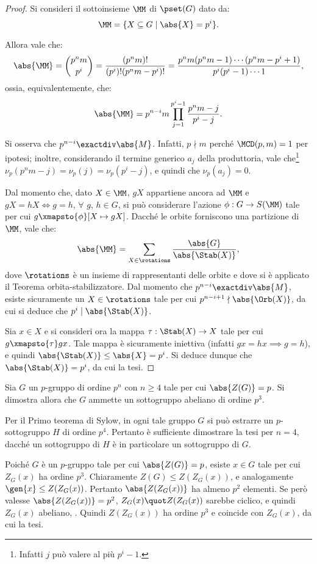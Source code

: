 \documentclass[12pt]{scrartcl}
\begin{document}
	\begin{proof}
		Si consideri il sottoinsieme $\MM$
		di $\pset(G)$ dato da:
		\[ \MM = \{ X \subseteq G \mid \abs{X} = p^i \}. \]


		Allora vale che:
		\[ \abs{\MM} = \binom{p^n m}{p^i} = \frac{(p^n m)!}{(p^i)! (p^n m - p^i)!} = \frac{p^n m (p^n m - 1) \cdots (p^n m - p^i + 1)}{p^i (p^i - 1) \cdots 1}, \]
		ossia, equivalentemente, che:
		\[ \abs{\MM} = p^{n-i} m \prod_{j=1}^{p^i - 1} \frac{p^n m - j}{p^i - j}. \]


		Si osserva che $p^{n-i} \exactdiv \abs{M}$. Infatti,
		$p \nmid m$ perché $\MCD(p, m) = 1$ per ipotesi; inoltre,
		considerando il termine generico $a_j$ della produttoria,
		vale che\footnote{
			Infatti $j$ può valere al più $p^i - 1$.
		} $\nu_p(p^n m - j) = \nu_p(j) = \nu_p(p^i - j)$,
		e quindi che $\nu_p(a_j) = 0$. \medskip
		
		
		Dal momento che, dato $X \in \MM$, $g X$ appartiene ancora
		ad $\MM$ e $g X = h X \iff g = h$, $\forall$ $g$, $h \in G$,
		si può considerare l'azione $\phi : G \to S(\MM)$
		tale per cui $g \xmapsto{\phi} [X \mapsto gX]$.
		Dacché le orbite forniscono una partizione di $\MM$,
		vale che:
		\[ \abs{\MM} = \sum_{X \in \rotations} \frac{\abs{G}}{\abs{\Stab(X)}}, \]
		dove $\rotations$ è un insieme di rappresentanti delle
		orbite e dove si è applicato il Teorema orbita-stabilizzatore.
		Dal momento che $p^{n-i} \exactdiv \abs{M}$, esiste
		sicuramente un $X \in \rotations$ tale per cui
		$p^{n-i+1} \nmid \abs{\Orb(X)}$, da cui si deduce che
		$p^i \mid \abs{\Stab(X)}$. \medskip
		
		
		Sia $x \in X$ e si consideri ora la mappa $\tau : \Stab(X) \to X$ tale per cui $g \xmapsto{\tau} gx$. Tale mappa è
		sicuramente iniettiva (infatti $gx = hx \implies g = h$),
		e quindi $\abs{\Stab(X)} \leq \abs{X} = p^i$. Si deduce
		dunque che $\abs{\Stab(X)} = p^i$, da cui la tesi.
	\end{proof}
	
	
	\begin{example}
		Sia $G$ un $p$-gruppo di ordine $p^n$ con $n \geq 4$
		tale per cui
		$\abs{Z(G)} = p$. Si dimostra allora che $G$ ammette un sottogruppo abeliano di ordine $p^3$. \medskip
		
		
		Per il Primo teorema di Sylow, in ogni tale gruppo $G$
		si può estrarre un $p$-sottogruppo $H$ di ordine $p^4$.
		Pertanto è sufficiente dimostrare la tesi per $n = 4$,
		dacché un sottogruppo di $H$ è in particolare un sottogruppo
		di $G$. \medskip
		
		
		Poiché $G$ è un $p$-gruppo tale per cui $\abs{Z(G)} = p$,
		esiste $x \in G$ tale per cui $Z_G(x)$ ha ordine $p^3$.
		Chiaramente $Z(G) \leq Z(Z_G(x))$, e analogamente
		$\gen{x} \leq Z(Z_G(x))$. Pertanto $\abs{Z(Z_G(x))}$ ha
		almeno $p^2$ elementi. Se però valesse
		$\abs{Z(Z_G(x))} = p^2$, $Z_G(x) \quot Z(Z_G(x))$ sarebbe
		ciclico, e quindi $Z_G(x)$ abeliano, \Lightning. Quindi
		$Z(Z_G(x))$ ha ordine $p^3$ e coincide con $Z_G(x)$, da
		cui la tesi.
	\end{example} \bigskip
	
\end{document}

